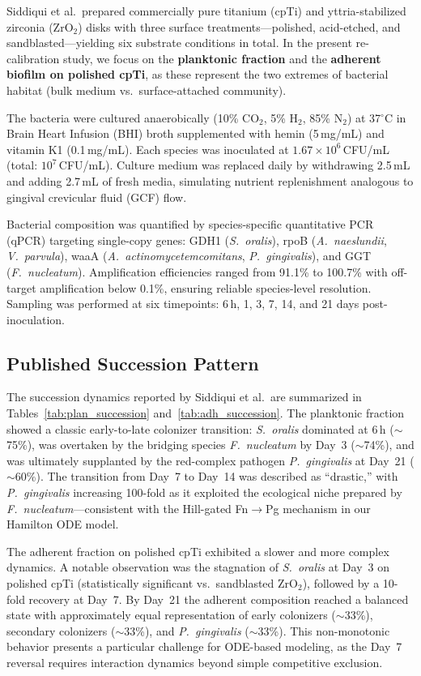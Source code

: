 \documentclass[11pt,a4paper]{article}
\begin{document}
Siddiqui et al.\ prepared commercially pure titanium (cpTi) and yttria-stabilized
zirconia (ZrO$_2$) disks with three surface treatments---polished, acid-etched, and
sandblasted---yielding six substrate conditions in total. In the present re-calibration
study, we focus on the \textbf{planktonic fraction} and the \textbf{adherent biofilm on
polished cpTi}, as these represent the two extremes of bacterial habitat (bulk medium
vs.\ surface-attached community).

The bacteria were cultured anaerobically (10\% CO$_2$, 5\% H$_2$, 85\% N$_2$) at
37$^\circ$C in Brain Heart Infusion (BHI) broth supplemented with hemin (5\,mg/mL) and
vitamin K1 (0.1\,mg/mL). Each species was inoculated at $1.67 \times 10^6$\,CFU/mL
(total: $10^7$\,CFU/mL). Culture medium was replaced daily by withdrawing 2.5\,mL
and adding 2.7\,mL of fresh media, simulating nutrient replenishment analogous to
gingival crevicular fluid (GCF) flow.

Bacterial composition was quantified by species-specific quantitative PCR (qPCR) targeting
single-copy genes: GDH1 (\textit{S.\ oralis}), rpoB (\textit{A.\ naeslundii},
\textit{V.\ parvula}), waaA (\textit{A.\ actinomycetemcomitans}, \textit{P.\ gingivalis}),
and GGT (\textit{F.\ nucleatum}). Amplification efficiencies ranged from 91.1\% to 100.7\%
with off-target amplification below 0.1\%, ensuring reliable species-level resolution.
Sampling was performed at six timepoints: 6\,h, 1, 3, 7, 14, and 21 days post-inoculation.

\subsection{Published Succession Pattern}

The succession dynamics reported by Siddiqui et al.\ are summarized in Tables~\ref{tab:plan_succession}
and~\ref{tab:adh_succession}. The planktonic fraction showed a classic early-to-late colonizer
transition: \textit{S.\ oralis} dominated at 6\,h ($\sim$75\%), was overtaken by the bridging
species \textit{F.\ nucleatum} by Day~3 ($\sim$74\%), and was ultimately supplanted by the
red-complex pathogen \textit{P.\ gingivalis} at Day~21 ($\sim$60\%). The transition from
Day~7 to Day~14 was described as ``drastic,'' with \textit{P.\ gingivalis} increasing 100-fold
as it exploited the ecological niche prepared by \textit{F.\ nucleatum}---consistent with the
Hill-gated Fn$\to$Pg mechanism in our Hamilton ODE model.

The adherent fraction on polished cpTi exhibited a slower and more complex dynamics.
A notable observation was the stagnation of \textit{S.\ oralis} at Day~3 on polished cpTi
(statistically significant vs.\ sandblasted ZrO$_2$), followed by a 10-fold recovery at Day~7.
By Day~21 the adherent composition reached a balanced state with approximately equal representation
of early colonizers ($\sim$33\%), secondary colonizers ($\sim$33\%), and \textit{P.\ gingivalis}
($\sim$33\%). This non-monotonic behavior presents a particular challenge for ODE-based
modeling, as the Day~7 reversal requires interaction dynamics beyond simple competitive exclusion.
\end{document}
